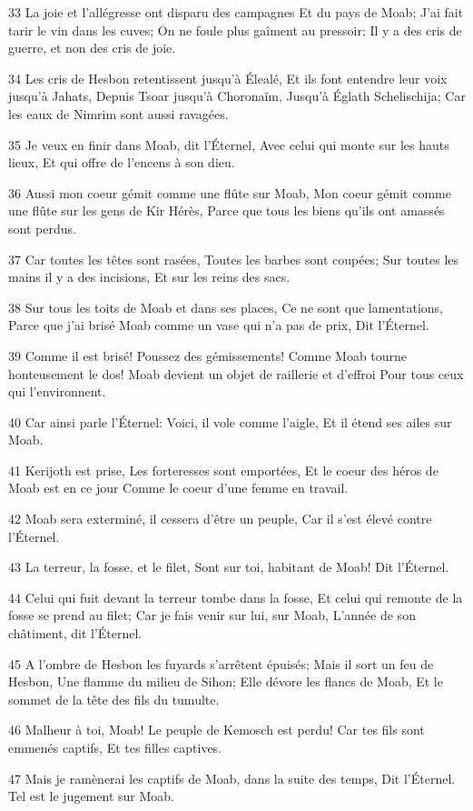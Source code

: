 \par 33 La joie et l'allégresse ont disparu des campagnes Et du pays de Moab; J'ai fait tarir le vin dans les cuves; On ne foule plus gaîment au pressoir; Il y a des cris de guerre, et non des cris de joie.
\par 34 Les cris de Hesbon retentissent jusqu'à Élealé, Et ils font entendre leur voix jusqu'à Jahats, Depuis Tsoar jusqu'à Choronaïm, Jusqu'à Églath Schelischija; Car les eaux de Nimrim sont aussi ravagées.
\par 35 Je veux en finir dans Moab, dit l'Éternel, Avec celui qui monte sur les hauts lieux, Et qui offre de l'encens à son dieu.
\par 36 Aussi mon coeur gémit comme une flûte sur Moab, Mon coeur gémit comme une flûte sur les gens de Kir Hérès, Parce que tous les biens qu'ils ont amassés sont perdus.
\par 37 Car toutes les têtes sont rasées, Toutes les barbes sont coupées; Sur toutes les mains il y a des incisions, Et sur les reins des sacs.
\par 38 Sur tous les toits de Moab et dans ses places, Ce ne sont que lamentations, Parce que j'ai brisé Moab comme un vase qui n'a pas de prix, Dit l'Éternel.
\par 39 Comme il est brisé! Poussez des gémissements! Comme Moab tourne honteusement le dos! Moab devient un objet de raillerie et d'effroi Pour tous ceux qui l'environnent.
\par 40 Car ainsi parle l'Éternel: Voici, il vole comme l'aigle, Et il étend ses ailes sur Moab.
\par 41 Kerijoth est prise, Les forteresses sont emportées, Et le coeur des héros de Moab est en ce jour Comme le coeur d'une femme en travail.
\par 42 Moab sera exterminé, il cessera d'être un peuple, Car il s'est élevé contre l'Éternel.
\par 43 La terreur, la fosse, et le filet, Sont sur toi, habitant de Moab! Dit l'Éternel.
\par 44 Celui qui fuit devant la terreur tombe dans la fosse, Et celui qui remonte de la fosse se prend au filet; Car je fais venir sur lui, sur Moab, L'année de son châtiment, dit l'Éternel.
\par 45 A l'ombre de Hesbon les fuyards s'arrêtent épuisés; Mais il sort un feu de Hesbon, Une flamme du milieu de Sihon; Elle dévore les flancs de Moab, Et le sommet de la tête des fils du tumulte.
\par 46 Malheur à toi, Moab! Le peuple de Kemosch est perdu! Car tes fils sont emmenés captifs, Et tes filles captives.
\par 47 Mais je ramènerai les captifs de Moab, dans la suite des temps, Dit l'Éternel. Tel est le jugement sur Moab.


